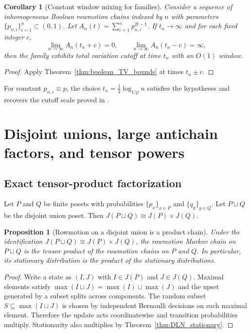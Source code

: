 \documentclass[final,3p,times]{elsarticle}
\newtheorem{proposition}[theorem]{Proposition}
\newtheorem{corollary}[theorem]{Corollary}
\theoremstyle{definition}
\begin{document}
\begin{corollary}[Constant window mixing for families]\label{cor:boolean_cutoff_clock}
Consider a sequence of inhomogeneous Boolean rowmotion chains indexed by $n$ with parameters $\{p_{n,i}\}_{i=1}^n\subset(0,1)$.
Let $A_n(t)=\sum_{i=1}^n p_{n,i}^{2t-1}$.
If $t_n\to\infty$ and for each fixed integer $c$,
\[
\lim_{n\to\infty}A_n(t_n+c)=0,
\qquad
\lim_{n\to\infty}A_n(t_n-c)=\infty,
\]
then the family exhibits total variation cutoff at time $t_n$ with an $O(1)$ window.
\end{corollary}

\begin{proof}
Apply Theorem~\ref{thm:boolean_TV_bounds} at times $t_n\pm c$.
\end{proof}

For constant $p_{n,i}\equiv p$, the choice $t_n=\frac12\log_{1/p}n$ satisfies the hypotheses and recovers the cutoff scale proved in \cite{DefantLiNestoridi2024Rowmotion}.

\section{Disjoint unions, large antichain factors, and tensor powers}

\subsection{Exact tensor-product factorization}

Let $P$ and $Q$ be finite posets with probabilities $\{p_x\}_{x\in P}$ and $\{q_y\}_{y\in Q}$.
Let $P\sqcup Q$ be the disjoint union poset.
Then $J(P\sqcup Q)\cong J(P)\times J(Q)$.

\begin{proposition}[Rowmotion on a disjoint union is a product chain]\label{prop:disjoint_union_product}
Under the identification $J(P\sqcup Q)\cong J(P)\times J(Q)$, the rowmotion Markov chain on $P\sqcup Q$ is the tensor product of the rowmotion chains on $P$ and $Q$.
In particular, its stationary distribution is the product of the stationary distributions.
\end{proposition}

\begin{proof}
Write a state as $(I,J)$ with $I\in J(P)$ and $J\in J(Q)$.
Maximal elements satisfy $\max(I\sqcup J)=\max(I)\sqcup \max(J)$ and the upset generated by a subset splits across components.
The random subset $S\subseteq\max(I\sqcup J)$ is chosen by independent Bernoulli decisions on each maximal element.
Therefore the update acts coordinatewise and transition probabilities multiply.
Stationarity also multiplies by Theorem~\ref{thm:DLN_stationary}.
\end{proof}
\end{document}
